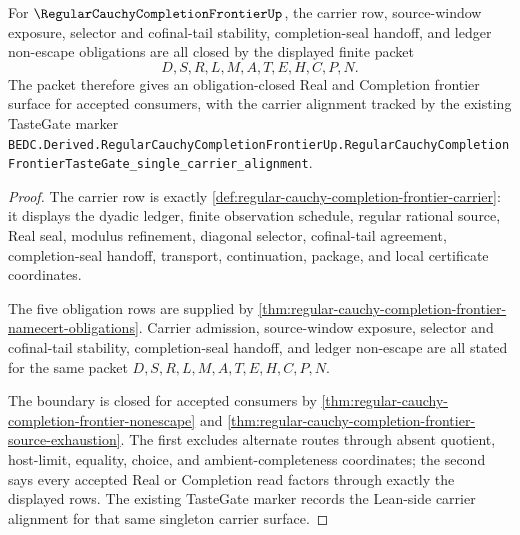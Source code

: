 \begin{theorem}
\label{thm:regular-cauchy-completion-frontier-obligation-closure}
For $\RegularCauchyCompletionFrontierUp$, the carrier row, source-window exposure, selector and cofinal-tail stability, completion-seal handoff, and ledger non-escape obligations are all closed by the displayed finite packet
$$
D,S,R,L,M,A,T,E,H,C,P,N.
$$
The packet therefore gives an obligation-closed Real and Completion frontier surface for accepted consumers, with the carrier alignment tracked by the existing TasteGate marker
\texttt{BEDC.Derived.RegularCauchyCompletionFrontierUp.RegularCauchyCompletionFrontierTasteGate\_single\_carrier\_alignment}.
\end{theorem}
\begin{proof}
The carrier row is exactly \autoref{def:regular-cauchy-completion-frontier-carrier}: it displays the dyadic ledger, finite observation schedule, regular rational source, Real seal, modulus refinement, diagonal selector, cofinal-tail agreement, completion-seal handoff, transport, continuation, package, and local certificate coordinates.

The five obligation rows are supplied by \autoref{thm:regular-cauchy-completion-frontier-namecert-obligations}. Carrier admission, source-window exposure, selector and cofinal-tail stability, completion-seal handoff, and ledger non-escape are all stated for the same packet $D,S,R,L,M,A,T,E,H,C,P,N$.

The boundary is closed for accepted consumers by \autoref{thm:regular-cauchy-completion-frontier-nonescape} and \autoref{thm:regular-cauchy-completion-frontier-source-exhaustion}. The first excludes alternate routes through absent quotient, host-limit, equality, choice, and ambient-completeness coordinates; the second says every accepted Real or Completion read factors through exactly the displayed rows. The existing TasteGate marker records the Lean-side carrier alignment for that same singleton carrier surface.
\end{proof}


